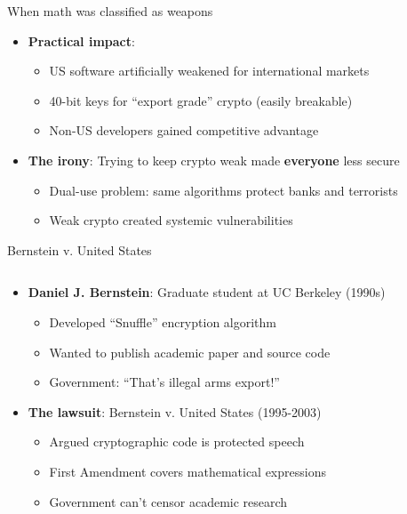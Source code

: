 \documentclass[aspectratio=169, lualatex, handout]{beamer}
\begin{document}
\begin{frame}{When math was classified as weapons}
	\begin{itemize}[<+->]
		\item \textbf{Practical impact}:
		      \begin{itemize}
			      \item US software artificially weakened for international markets
			      \item 40-bit keys for ``export grade'' crypto (easily breakable)
			      \item Non-US developers gained competitive advantage
		      \end{itemize}
		\item \textbf{The irony}: Trying to keep crypto weak made \textbf{everyone} less secure
		      \begin{itemize}
			      \item Dual-use problem: same algorithms protect banks and terrorists
			      \item Weak crypto created systemic vulnerabilities
		      \end{itemize}
	\end{itemize}
\end{frame}

\begin{frame}{Bernstein v. United States}
	\begin{columns}[c]
		\begin{column}{0.7\textwidth}
			\begin{itemize}[<+->]
				\item \textbf{Daniel J. Bernstein}: Graduate student at UC Berkeley (1990s)
				      \begin{itemize}
					      \item Developed ``Snuffle'' encryption algorithm
					      \item Wanted to publish academic paper and source code
					      \item Government: ``That's illegal arms export!''
				      \end{itemize}
				\item \textbf{The lawsuit}: Bernstein v. United States (1995-2003)
				      \begin{itemize}
					      \item Argued cryptographic code is protected speech
					      \item First Amendment covers mathematical expressions
					      \item Government can't censor academic research
				      \end{itemize}
			\end{itemize}
		\end{column}
		\begin{column}{0.3\textwidth}
		\end{column}
	\end{columns}
\end{frame}
\end{document}
